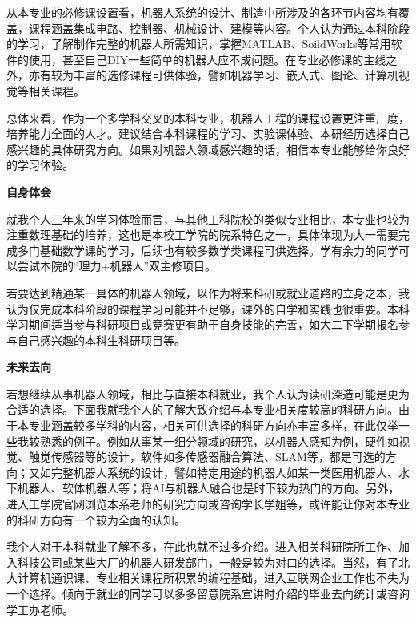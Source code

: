 \documentclass[11pt,oneside]{book}
\begin{document}
从本专业的必修课设置看，机器人系统的设计、制造中所涉及的各环节内容均有覆盖，课程涵盖集成电路、控制器、机械设计、建模等内容。个人认为通过本科阶段的学习，了解制作完整的机器人所需知识，掌握MATLAB、SoildWorks等常用软件的使用，甚至自己DIY一些简单的机器人应不成问题。在专业必修课的主线之外，亦有较为丰富的选修课程可供体验，譬如机器学习、嵌入式、图论、计算机视觉等相关课程。

\vspace{10pt}

总体来看，作为一个多学科交叉的本科专业，机器人工程的课程设置更注重广度，培养能力全面的人才。建议结合本科课程的学习、实验课体验、本研经历选择自己感兴趣的具体研究方向。如果对机器人领域感兴趣的话，相信本专业能够给你良好的学习体验。

\vspace{10pt}

\textbf{自身体会}

就我个人三年来的学习体验而言，与其他工科院校的类似专业相比，本专业也较为注重数理基础的培养，这也是本校工学院的院系特色之一，具体体现为大一需要完成多门基础数学课的学习，后续也有较多数学类课程可供选择。学有余力的同学可以尝试本院的“理力+机器人”双主修项目。

\vspace{10pt}

若要达到精通某一具体的机器人领域，以作为将来科研或就业道路的立身之本，我认为仅完成本科阶段的课程学习可能并不足够，课外的自学和实践也很重要。本科学习期间适当参与科研项目或竞赛更有助于自身技能的完善，如大二下学期报名参与自己感兴趣的本科生科研项目等。

\vspace{10pt}

\textbf{未来去向}

若想继续从事机器人领域，相比与直接本科就业，我个人认为读研深造可能是更为合适的选择。下面我就我个人的了解大致介绍与本专业相关度较高的科研方向。由于本专业涵盖较多学科的内容，相关可供选择的科研方向亦丰富多样，在此仅举一些我较熟悉的例子。例如从事某一细分领域的研究，以机器人感知为例，硬件如视觉、触觉传感器等的设计，软件如多传感器融合算法、SLAM等，都是可选的方向；又如完整机器人系统的设计，譬如特定用途的机器人如某一类医用机器人、水下机器人、软体机器人等；将AI与机器人融合也是时下较为热门的方向。另外，进入工学院官网浏览本系老师的研究方向或咨询学长学姐等，或许能让你对本专业的科研方向有一个较为全面的认知。

\vspace{10pt}

我个人对于本科就业了解不多，在此也就不过多介绍。进入相关科研院所工作、加入科技公司或某些大厂的机器人研发部门，一般是较为对口的选择。当然，有了北大计算机通识课、专业相关课程所积累的编程基础，进入互联网企业工作也不失为一个选择。倾向于就业的同学可以多多留意院系宣讲时介绍的毕业去向统计或咨询学工办老师。
\end{document}
